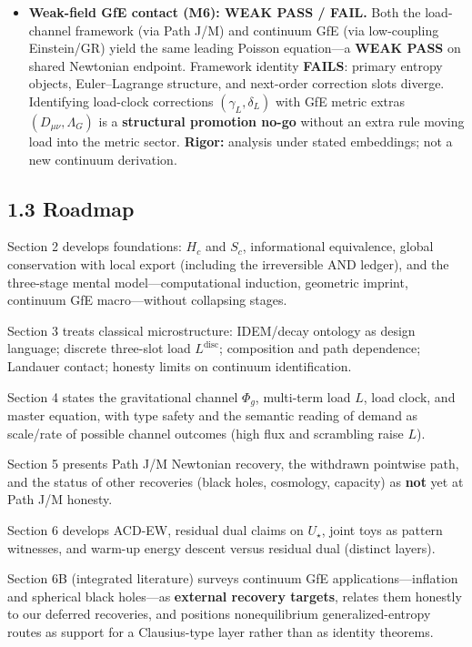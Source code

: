\documentclass[
  11pt,
]{article}
\newcounter{none} %
\begin{document}
\begin{itemize}
\item
  \textbf{Weak-field GfE contact (M6): WEAK PASS / FAIL.} Both the load-channel framework (via Path J/M) and continuum GfE (via low-coupling Einstein/GR) yield the same leading Poisson equation---a \textbf{WEAK PASS} on shared Newtonian endpoint. Framework identity \textbf{FAILS}: primary entropy objects, Euler--Lagrange structure, and next-order correction slots diverge. Identifying load-clock corrections \((\gamma_L,\delta_L)\) with GfE metric extras \((D_{\mu\nu},\Lambda_G)\) is a \textbf{structural promotion no-go} without an extra rule moving load into the metric sector. \textbf{Rigor:} analysis under stated embeddings; not a new continuum derivation.
\end{itemize}

\subsection{1.3 Roadmap}\label{roadmap}

Section 2 develops foundations: \(H_c\) and \(S_c\), informational equivalence, global conservation with local export (including the irreversible AND ledger), and the three-stage mental model---computational induction, geometric imprint, continuum GfE macro---without collapsing stages.

Section 3 treats classical microstructure: IDEM/decay ontology as design language; discrete three-slot load \(L^{\mathrm{disc}}\); composition and path dependence; Landauer contact; honesty limits on continuum identification.

Section 4 states the gravitational channel \(\Phi_g\), multi-term load \(L\), load clock, and master equation, with type safety and the semantic reading of demand as scale/rate of possible channel outcomes (high flux and scrambling raise \(L\)).

Section 5 presents Path J/M Newtonian recovery, the withdrawn pointwise path, and the status of other recoveries (black holes, cosmology, capacity) as \textbf{not} yet at Path J/M honesty.

Section 6 develops ACD-EW, residual dual claims on \(U_\star\), joint toys as pattern witnesses, and warm-up energy descent versus residual dual (distinct layers).

Section 6B (integrated literature) surveys continuum GfE applications---inflation and spherical black holes---as \textbf{external recovery targets}, relates them honestly to our deferred recoveries, and positions nonequilibrium generalized-entropy routes as support for a Clausius-type layer rather than as identity theorems.
\end{document}
